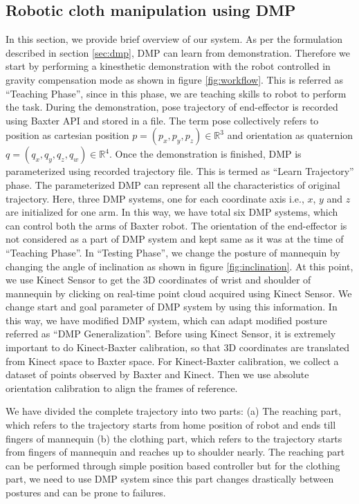 \documentclass[sigconf]{acmart}
\begin{document}
\subsection{Robotic cloth manipulation using DMP}
\label{sec:system_overview}
In this section, we provide brief overview of our system. As per the formulation described in section \ref{sec:dmp}, DMP can learn from demonstration. Therefore we start by performing a kinesthetic demonstration with the robot controlled in gravity compensation mode as shown in figure \ref{fig:workflow}. This is referred as ``Teaching Phase'', since in this phase, we are teaching skills to robot to perform the task.  During the demonstration, pose trajectory of end-effector is recorded using Baxter API and stored in a file. The term pose collectively refers to position as cartesian position $p = (p_x, p_y, p_z) \in \mathbb{R}^3$ and orientation as quaternion $q = (q_x, q_y, q_z, q_w) \in \mathbb{R}^4$. Once the demonstration is finished, DMP is parameterized using recorded trajectory file. This is termed as ``Learn Trajectory'' phase. The parameterized DMP can represent all the characteristics of original trajectory. Here, three DMP systems, one for each coordinate axis i.e., $x$, $y$ and $z$ are initialized for one arm. In this way, we have total six DMP systems, which can control both the arms of Baxter robot. The orientation of the end-effector is not considered as a part of DMP system and kept same as it was at the time of ``Teaching Phase''. In ``Testing Phase'', we change the posture of mannequin by changing the angle of inclination as shown in figure \ref{fig:inclination}. At this point, we use Kinect Sensor to get the 3D coordinates of wrist and shoulder of mannequin by clicking on real-time point cloud acquired using Kinect Sensor. We change start and goal parameter of DMP system by using this information. In this way, we have modified DMP system, which can adapt modified posture referred as ``DMP Generalization''. Before using Kinect Sensor, it is extremely important to do Kinect-Baxter calibration, so that 3D coordinates are translated from Kinect space to Baxter space. For Kinect-Baxter calibration, we collect a dataset of points observed by Baxter and Kinect. Then we use absolute orientation calibration \citep{umeyama1991least} to align the frames of reference.

We have divided the complete trajectory into two parts: (a) The reaching part, which refers to the trajectory starts from home position of robot and ends till fingers of mannequin (b) the clothing part, which refers to the trajectory starts from fingers of mannequin and reaches up to shoulder nearly. The reaching part can be performed through simple position based controller but for the clothing part, we need to use DMP system since this part changes drastically between postures and can be prone to failures.
\end{document}
